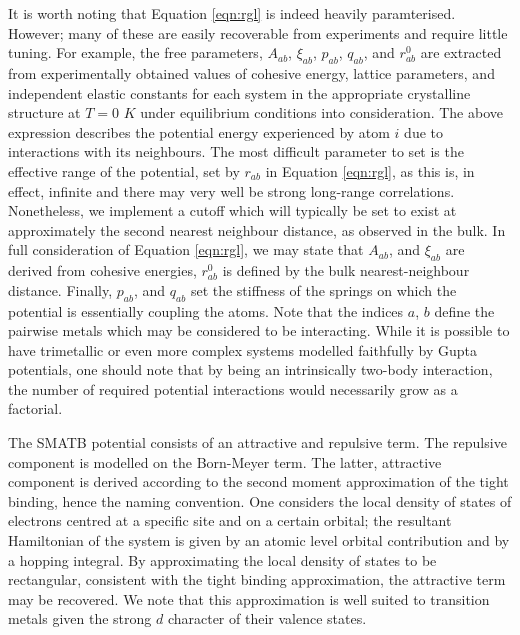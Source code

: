 It is worth noting that Equation \ref{eqn:rgl} is indeed heavily paramterised. However; many of these are easily recoverable from experiments and require little tuning. For example, the free parameters, $A_{ab}$, $\xi_{ab}$, $p_{ab}$, $q_{ab}$, and $r_{ab}^{0}$ are extracted from experimentally obtained values of cohesive energy, lattice parameters, and independent elastic constants for each system in the appropriate crystalline structure at $T=0$ $K$ under equilibrium conditions into consideration. The above expression describes the potential energy experienced by atom $i$ due to interactions with its neighbours. The most difficult parameter to set is the effective range of the potential, set by $r_{ab}$ in Equation \ref{eqn:rgl}, as this is, in effect, infinite and there may very well be strong long-range correlations. Nonetheless, we implement a cutoff which will typically be set to exist at approximately the second nearest neighbour distance, as observed in the bulk. In full consideration of Equation \ref{eqn:rgl}, we may state that $A_{ab}$, and $\xi_{ab}$ are derived from cohesive energies, $r_{ab}^{0}$ is defined by the bulk nearest-neighbour distance. Finally, $p_{ab}$, and $q_{ab}$ set the stiffness of the springs on which the potential is essentially coupling the atoms. Note that the indices $a$, $b$ define the pairwise metals which may be considered to be interacting. While it is possible to have trimetallic or even more complex systems modelled faithfully by Gupta potentials, one should note that by being an intrinsically two-body interaction, the number of required potential interactions would necessarily grow as a factorial.

The SMATB potential consists of an attractive and repulsive term. The repulsive component is modelled on the Born-Meyer term. The latter, attractive component is derived according to the second moment approximation of the tight binding, hence the naming convention. One considers the local density of states of electrons centred at a specific site and on a certain orbital; the resultant Hamiltonian of the system is given by an atomic level orbital contribution and by a hopping integral. By approximating the local density of states to be rectangular, consistent with the tight binding approximation, the attractive term may be recovered. We note that this approximation is well suited to transition metals given the strong $d$ character of their valence states. 

